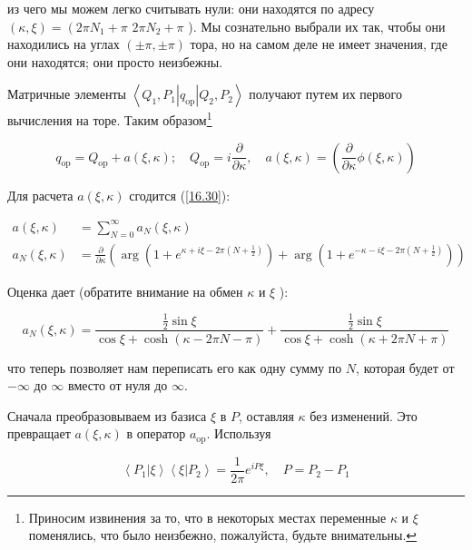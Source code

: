 \documentclass[main.tex]{subfiles}
\begin{document}
из чего мы можем легко считывать нули: они находятся по адресу $(\kappa, \xi)=\left(2 \pi N_{1}+\pi\right.$ $2 \pi N_{2}+\pi$ ). Мы сознательно выбрали их так, чтобы они находились на углах $(\pm \pi, \pm \pi)$ тора, но на самом деле не имеет значения, где они находятся; они просто неизбежны.

Матричные элементы $\left\langle Q_{1}, P_{1}\left|q_{\mathrm{op}}\right| Q_{2}, P_{2}\right\rangle$ получают путем их первого вычисления на торе. Таким образом\footnote{Приносим извинения за то, что в некоторых местах переменные $\kappa$ и $\xi$ поменялись, что было неизбежно, пожалуйста, будьте внимательны.}

\begin{equation}\label{16.} 
q_{\mathrm{op}}=Q_{\mathrm{op}}+a(\xi, \kappa) ; \quad Q_{\mathrm{op}}=i \frac{\partial}{\partial \kappa}, \quad a(\xi, \kappa)=\left(\frac{\partial}{\partial \kappa} \phi(\xi, \kappa)\right)
\end{equation}


Для расчета $a(\xi, \kappa)$ сгодится (\ref{16.30}):

\begin{equation}\label{16.32} 
\begin{aligned}
a(\xi, \kappa) &=\sum_{N=0}^{\infty} a_{N}(\xi, \kappa) \\
a_{N}(\xi, \kappa) &=\frac{\partial}{\partial \kappa}\left(\arg \left(1+e^{\kappa+i \xi-2 \pi\left(N+\frac{1}{2}\right)}\right)+\arg \left(1+e^{-\kappa-i \xi-2 \pi\left(N+\frac{1}{2}\right)}\right)\right)
\end{aligned}
\end{equation}

Оценка дает (обратите внимание на обмен $\kappa$ и $\xi$ ):

\begin{equation}\label{16.33}
a_{N}(\xi, \kappa)=\frac{\frac{1}{2} \sin \xi}{\cos \xi+\cosh (\kappa-2 \pi N-\pi)}+\frac{\frac{1}{2} \sin \xi}{\cos \xi+\cosh (\kappa+2 \pi N+\pi)}
\end{equation}

что теперь позволяет нам переписать его как одну сумму по $N$, которая будет от $-\infty$ до $\infty$ вместо от нуля до $\infty$.

Сначала преобразовываем из базиса $\xi$ в $P$, оставляя $\kappa$ без изменений. Это превращает $a(\xi, \kappa)$ в оператор $a_{\mathrm{op}}$. Используя

\begin{equation}\label{16.34} 
\left\langle P_{1} | \xi\right\rangle\left\langle\xi | P_{2}\right\rangle=\frac{1}{2 \pi} e^{i P \xi}, \quad P=P_{2}-P_{1}
\end{equation}
\end{document}
